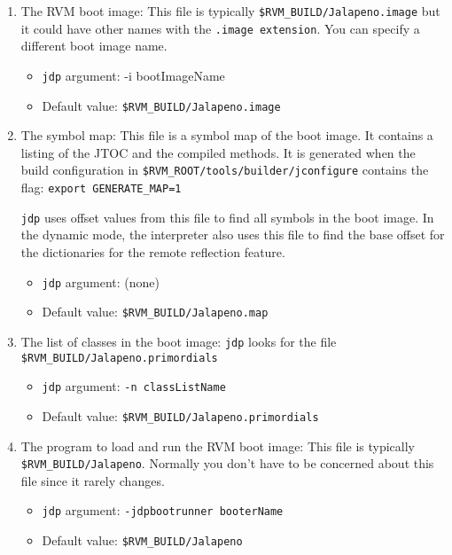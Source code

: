 \begin{enumerate}
\item The RVM boot image:
   This file is typically {\tt \$RVM\_BUILD/Jalapeno.image} but it could
   have other names with the {\tt .image extension}.  You can specify a
   different boot image name.
\begin{itemize}
\item    {\tt jdp} argument:    {-i bootImageName}
\item   Default value:          {\tt \$RVM\_BUILD/Jalapeno.image}
\end{itemize}

\item The symbol map:
   This file is a symbol map of the boot image.  It contains a listing of the 
   JTOC and the compiled methods.  It is generated when the build configuration 
   in {\tt \$RVM\_ROOT/tools/builder/jconfigure} contains the flag:
        {\tt export GENERATE\_MAP=1}

   {\tt jdp} uses offset 
   values from this file to find all symbols in the boot image.
   In the dynamic mode, the interpreter also uses this file to find the base 
   offset for the dictionaries for the remote reflection feature.
\begin{itemize}
\item   {\tt jdp} argument:     (none)
\item    Default value: {\tt \$RVM\_BUILD/Jalapeno.map}
\end{itemize}

\item The list of classes in the boot image:
   {\tt jdp} looks for the file {\tt \$RVM\_BUILD/Jalapeno.primordials}

\begin{itemize}
\item   {\tt jdp} argument:     {\tt -n classListName}
\item   Default value:  {\tt \$RVM\_BUILD/Jalapeno.primordials}
\end{itemize}

\item The program to load and run the RVM boot image:
   This file is typically {\tt \$RVM\_BUILD/Jalapeno}.
   Normally you don't have to be concerned about this file since it rarely
   changes.
\begin{itemize}
\item   {\tt jdp} argument:     {\tt -jdpbootrunner booterName}
\item   Default value:  {\tt \$RVM\_BUILD/Jalapeno}
\end{itemize}
\end{enumerate}

